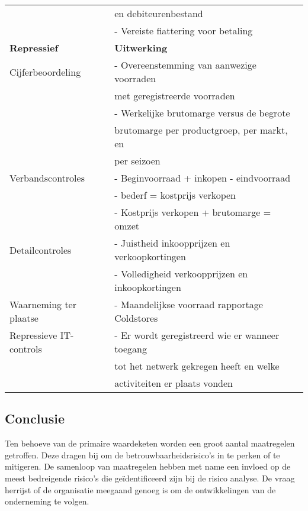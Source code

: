 \begin{table}[h!]
\begin{tabular}{l l}
        & en debiteurenbestand \\
        & - Vereiste fiattering voor betaling \\
        \midrule
        \textbf{Repressief} & \textbf{Uitwerking} \\
        \midrule
        Cijferbeoordeling & - Overeenstemming van aanwezige voorraden  \\
        & met geregistreerde voorraden \\
        & - Werkelijke brutomarge versus de begrote \\
        & brutomarge per productgroep, per markt, en \\
        & per seizoen \\
        Verbandscontroles & - Beginvoorraad + inkopen - eindvoorraad \\
        & - bederf = kostprijs verkopen \\
        & - Kostprijs verkopen + brutomarge = omzet \\
        Detailcontroles & - Juistheid inkoopprijzen en verkoopkortingen \\
        & - Volledigheid verkoopprijzen en inkoopkortingen \\
        Waarneming ter plaatse & - Maandelijkse voorraad rapportage Coldstores\\
        Repressieve IT-controls & - Er wordt geregistreerd wie er wanneer toegang \\
        & tot het netwerk gekregen heeft en welke \\
        & activiteiten er plaats vonden \\
        \bottomrule
    \end{tabular}
    \label{tab:maatregelen}
\end{table}

\newpage

\subsection*{Conclusie}
Ten behoeve van de primaire waardeketen worden een groot aantal maatregelen getroffen. Deze dragen bij om de betrouwbaarheidsrisico's in te perken of te mitigeren. De samenloop van maatregelen hebben met name een invloed op de meest bedreigende risico's die geïdentificeerd zijn bij de risico analyse. De vraag herrijst of de organisatie meegaand genoeg is om de ontwikkelingen van de onderneming te volgen. 
